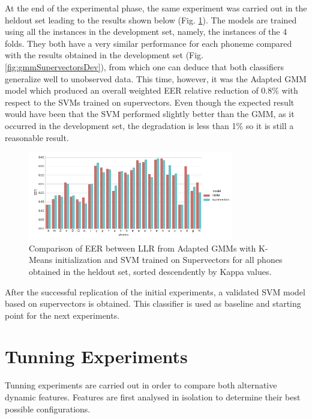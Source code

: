 At the end of the experimental phase,
the same experiment was carried out in the heldout set
leading to the results shown below
(Fig. \ref{fig:gmmSupervectorsTest}).
The models are trained using all the instances in the development set, namely, the
instances of the 4 folds.
They both have a very similar performance for each phoneme compared with the results obtained
in the development set (Fig. \ref{fig:gmmSupervectorsDev}),
from which one can deduce that both classifiers generalize well to
unobserved data. This time, however, it was the Adapted GMM model
which produced an overall weighted EER relative reduction of 0.8\% with respect to the SVMs
trained on supervectors. Even though the expected result would have been that the SVM performed
slightly better than the GMM, as it occurred in the development set,
the degradation is less than 1\% so it is still a reasonable result.


\begin{figure}[H]
	\centering
	\includegraphics[width=0.8\textwidth]{files/figures/results/gmm-vs-supervectors/gmm-vs-supervectors-heldout.png}
	\caption{Comparison of EER between LLR from Adapted GMMs with K-Means initialization
	and SVM trained on Supervectors for all phones obtained in the heldout set, sorted descendently
	by Kappa values.}
	\label{fig:gmmSupervectorsTest}
\end{figure}

After the successful replication of the initial experiments, a validated SVM model based on
supervectors is obtained. This classifier is used as baseline and starting point for
the next experiments.

\section{Tunning Experiments}

Tunning experiments are carried out in order to compare both alternative
dynamic features. Features are first analysed in isolation to
determine their best possible configurations.

